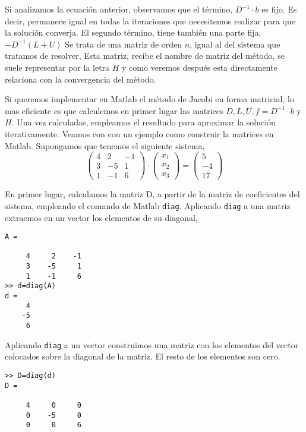 Si analizamos la ecuación anterior, observamos que el término, $D^{-1}\cdot b$ es fijo. Es decir, permanece igual en todas la iteraciones que necesitemos realizar para que la solución converja. El segundo término, tiene también una parte fija, $-D^{-1}(L+U)$ Se trata de una matriz de orden $n$, igual al del sistema que tratamos de resolver, Esta matriz, recibe el nombre de matriz del método, se suele representar por la letra $H$ y como veremos después esta directamente relaciona con la convergencia del método.

Si queremos implementar en Matlab el método de Jacobi en forma matricial, lo mas eficiente es que calculemos en primer lugar las matrices $D, L, U, f=D^{-1}\cdot b$ y $H$. Una vez calculadas, empleamos el resultado para aproximar la solución iterativamente. Veamos con con un ejemplo como construir la matrices en Matlab. Supongamos que tenemos el siguiente sistema,
\begin{equation*}
\begin{pmatrix}
4& 2& -1\\
3& -5& 1\\
1& -1& 6
\end{pmatrix}\cdot \begin{pmatrix}
x_1\\
x_2\\
x_3
\end{pmatrix}=\begin{pmatrix}
5\\
-4\\
17
\end{pmatrix}
\end{equation*}


En primer lugar, calculamos la matriz D, a partir de la matriz de coeficientes del sistema, empleando el comando de Matlab \texttt{diag}. Aplicando \texttt{diag} a una matriz extraemos en un vector los elementos de su diagonal, 

\begin{verbatim}
A =

     4     2    -1
     3    -5     1
     1    -1     6
>> d=diag(A)
d =
     4
    -5
     6
\end{verbatim}

Aplicando \texttt{diag} a un vector construimos una matriz con los elementos del vector colocados sobre la diagonal de la matriz. El resto de los elementos son cero.

\begin{verbatim}
>> D=diag(d)
D =

     4     0     0
     0    -5     0
     0     0     6
\end{verbatim}

